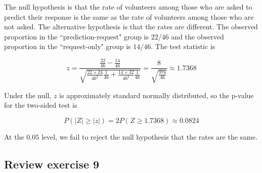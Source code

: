 \documentclass[11pt]{article}
\newcommand{\pr}{P} %
\begin{document}
The null hypothesis is that the rate of volunteers among those who are asked to predict their response is the same as the rate of volunteers among those who are not asked.  The alternative hypothesis is that the rates are different.  The observed proportion in the ``prediction-request" group is $22/46$ and the observed proportion in the ``request-only" group is $14/46$.  The test statistic is

$$z = \frac{ \frac{22}{46}-\frac{14}{46}}{ \sqrt{\frac{22\times 24}{46^2}\frac{1}{46} + \frac{14\times32}{46^2}\frac{1}{46}}} = \frac{ 8}{ \sqrt{\frac{976}{46}}} \approx  1.7368$$

Under the null, $z$ is approximately standard normally distributed, so the p-value for the two-sided test is

$$\pr( \lvert Z \rvert \geq \lvert z \rvert) = 2 \pr(Z \geq 1.7368) \approx 0.0824$$

At the $0.05$ level, we fail to reject the null hypothesis that the rates are the same.


\subsection{Review exercise 9} %
\end{document}
